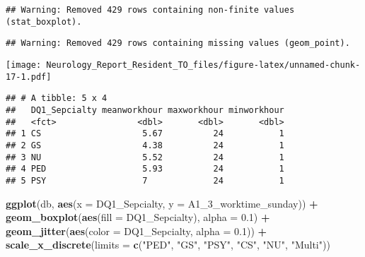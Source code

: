 \documentclass[]{book}
\newenvironment{Shaded}{\begin{snugshade}}{\end{snugshade}}
\newcommand{\DataTypeTok}[1]{\textcolor[rgb]{0.13,0.29,0.53}{#1}}
\newcommand{\DecValTok}[1]{\textcolor[rgb]{0.00,0.00,0.81}{#1}}
\newcommand{\FloatTok}[1]{\textcolor[rgb]{0.00,0.00,0.81}{#1}}
\newcommand{\KeywordTok}[1]{\textcolor[rgb]{0.13,0.29,0.53}{\textbf{#1}}}
\newcommand{\NormalTok}[1]{#1}
\newcommand{\OperatorTok}[1]{\textcolor[rgb]{0.81,0.36,0.00}{\textbf{#1}}}
\newcommand{\StringTok}[1]{\textcolor[rgb]{0.31,0.60,0.02}{#1}}
\begin{document}
\begin{verbatim}
## Warning: Removed 429 rows containing non-finite values (stat_boxplot).
\end{verbatim}

\begin{verbatim}
## Warning: Removed 429 rows containing missing values (geom_point).
\end{verbatim}

\texttt{[image: Neurology\_Report\_Resident\_TO\_files/figure-latex/unnamed-chunk-17-1.pdf]}

\begin{Shaded}
\end{Shaded}

\begin{verbatim}
## # A tibble: 5 x 4
##   DQ1_Sepcialty meanworkhour maxworkhour minworkhour
##   <fct>                <dbl>       <dbl>       <dbl>
## 1 CS                    5.67          24           1
## 2 GS                    4.38          24           1
## 3 NU                    5.52          24           1
## 4 PED                   5.93          24           1
## 5 PSY                   7             24           1
\end{verbatim}

\begin{Shaded}
\begin{Highlighting}[]
\KeywordTok{ggplot}\NormalTok{(db, }\KeywordTok{aes}\NormalTok{(}\DataTypeTok{x =}\NormalTok{ DQ1_Sepcialty, }\DataTypeTok{y =}\NormalTok{ A1_}\DecValTok{3}\NormalTok{_worktime_sunday)) }\OperatorTok{+}
\StringTok{  }\KeywordTok{geom_boxplot}\NormalTok{(}\KeywordTok{aes}\NormalTok{(}\DataTypeTok{fill =}\NormalTok{ DQ1_Sepcialty), }\DataTypeTok{alpha =} \FloatTok{0.1}\NormalTok{) }\OperatorTok{+}\StringTok{ }
\StringTok{  }\KeywordTok{geom_jitter}\NormalTok{(}\KeywordTok{aes}\NormalTok{(}\DataTypeTok{color =}\NormalTok{ DQ1_Sepcialty, }\DataTypeTok{alpha =} \FloatTok{0.1}\NormalTok{)) }\OperatorTok{+}
\StringTok{  }\KeywordTok{scale_x_discrete}\NormalTok{(}\DataTypeTok{limits =} \KeywordTok{c}\NormalTok{(}\StringTok{"PED"}\NormalTok{, }\StringTok{"GS"}\NormalTok{, }\StringTok{"PSY"}\NormalTok{, }\StringTok{"CS"}\NormalTok{, }\StringTok{"NU"}\NormalTok{, }\StringTok{"Multi"}\NormalTok{))}
\end{Highlighting}
\end{Shaded}
\end{document}
